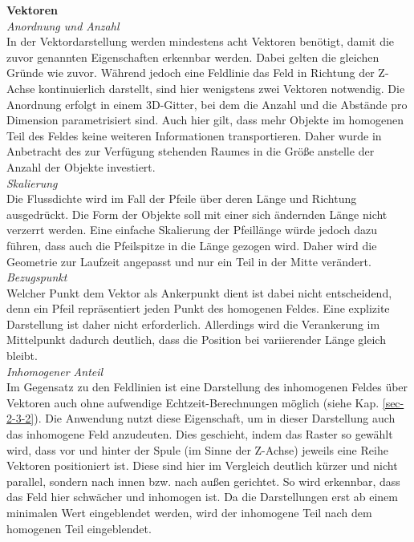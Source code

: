 \textbf{Vektoren}\\
\textit{Anordnung und Anzahl}\\
In der Vektordarstellung werden mindestens acht Vektoren benötigt, damit die zuvor genannten Eigenschaften erkennbar werden. Dabei gelten die gleichen Gründe wie zuvor. Während jedoch eine Feldlinie das Feld in Richtung der Z-Achse kontinuierlich darstellt, sind hier wenigstens zwei Vektoren notwendig. Die Anordnung erfolgt in einem 3D-Gitter, bei dem die Anzahl und die Abstände pro Dimension parametrisiert sind. Auch hier gilt, dass mehr Objekte im homogenen Teil des Feldes keine weiteren Informationen transportieren. Daher wurde in Anbetracht des zur Verfügung stehenden Raumes in die Größe anstelle der Anzahl der Objekte investiert.\\

\textit{Skalierung}\\
Die Flussdichte wird im Fall der Pfeile über deren Länge und Richtung ausgedrückt. Die Form der Objekte soll mit einer sich ändernden Länge nicht verzerrt werden. Eine einfache Skalierung der Pfeillänge würde jedoch dazu führen, dass auch die Pfeilspitze in die Länge gezogen wird. Daher wird die Geometrie zur Laufzeit angepasst und nur ein Teil in der Mitte verändert.\\

\textit{Bezugspunkt}\\
Welcher Punkt dem Vektor als Ankerpunkt dient ist dabei nicht entscheidend, denn ein Pfeil repräsentiert jeden Punkt des homogenen Feldes. Eine explizite Darstellung ist daher nicht erforderlich. Allerdings wird die Verankerung im Mittelpunkt dadurch deutlich, dass die Position bei variierender Länge gleich bleibt.\\

\textit{Inhomogener Anteil}\\
Im Gegensatz zu den Feldlinien ist eine Darstellung des inhomogenen Feldes über Vektoren auch ohne aufwendige Echtzeit-Berechnungen möglich (siehe Kap. \ref{sec-2-3-2}). Die Anwendung nutzt diese Eigenschaft, um in dieser Darstellung auch das inhomogene Feld anzudeuten. Dies geschieht, indem das Raster so gewählt wird, dass vor und hinter der Spule (im Sinne der Z-Achse) jeweils eine Reihe Vektoren positioniert ist. Diese sind hier im Vergleich deutlich kürzer und nicht parallel, sondern nach innen bzw. nach außen gerichtet. So wird erkennbar, dass das Feld hier schwächer und inhomogen ist. Da die Darstellungen erst ab einem minimalen Wert eingeblendet werden, wird der inhomogene Teil nach dem homogenen Teil eingeblendet.\\

